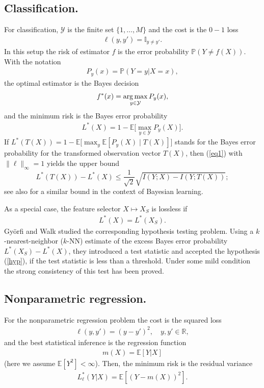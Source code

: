\documentclass[11pt]{article}
\def\R{{\mathbb R}}
\def\Y{\mathcal{Y}}
\def\PROB {{\mathbb P}}
\def\EXP {{\mathbb E}}
\def\IND{{\mathbb I}}
\def\argmax{\mathop{\rm arg\,max}}
\begin{document}
\label{sec-appl}

\subsection{Classification.}
For classification, $\Y$ is the  finite set $\{1,\dots,M\}$ and the cost is the $0-1$ loss
\begin{align*}
\ell(y,y')=\IND_{y\ne y'}.
\end{align*}
In this setup the risk of estimator $f$ is the error probability $\PROB(Y\neq f(X))$.
With the notation
\begin{align*}
P_y(x)=\PROB(Y=y| X=x),
\end{align*}
the optimal estimator is  the Bayes decision
\begin{align*}
f^*(x)=\argmax_{y\in \Y} P_y(x), 
\end{align*}
and the minimum risk is the Bayes error probability
\begin{align*}
L^*(X)=1-\EXP\Big[\max_{y\in \Y} P_y(X)\Big]. 
\end{align*}
If  $L^*(T(X))=1-\EXP\big[\max_y\EXP[P_y(X)\mid T(X)]\big]$ stands for the Bayes error probability for  the transformed observation vector $T(X)$, then (\ref{eq1}) with $\|\ell\|_{\infty}=1$ yields the upper bound 
\[
 L^*(T(X))- L^*(X)   \le  \frac{1}{\sqrt{2}} \sqrt{
  I(Y;X)-I(Y;T(X))};
\]
see also \cite[Corollary~2]{XuRa22} for a similar bound in the context of Bayesian learning. 

As a special case, the feature selector  $X\mapsto X_S$ is lossless if 
\begin{align}
\label{hyp}
L^*(X)=L^*(X_S).
\end{align}
Gy\"orfi and Walk \cite{GyWa17} studied  the corresponding hypothesis testing problem.
Using a $k$-nearest-neighbor ($k$-NN)  estimate of the excess Bayes error probability $L^*(X_S)-L^*(X)$, they introduced a test statistic and accepted the hypothesis (\ref{hyp}), if the test statistic is less than a threshold. Under some mild condition the strong consistency of this test has been proved.


\subsection{Nonparametric regression.}
\label{sec-regr}
For the nonparametric regression problem the cost is the squared loss
\begin{align*}
\ell(y,y')=(y- y')^2, \quad y,y'\in \R, 
\end{align*}
and the best statistical inference is the regression function
\begin{align*}
m(X)=\EXP[Y| X]
\end{align*}
(here we assume $\EXP[Y^2]<\infty$). Then, the minimum risk is the residual variance
\begin{align*}
L_\ell^*(Y|X)=\EXP[(Y-m(X))^2].
\end{align*}
\end{document}
